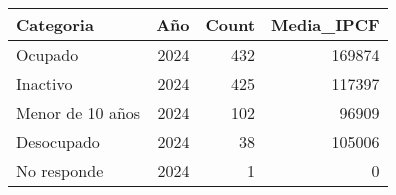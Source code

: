 \begin{tabular}{lrrr}
\toprule
Categoria & Año & Count & Media_IPCF \\
\midrule
Ocupado & 2024 & 432 & 169874 \\
Inactivo & 2024 & 425 & 117397 \\
Menor de 10 años & 2024 & 102 & 96909 \\
Desocupado & 2024 & 38 & 105006 \\
No responde & 2024 & 1 & 0 \\
\bottomrule
\end{tabular}
